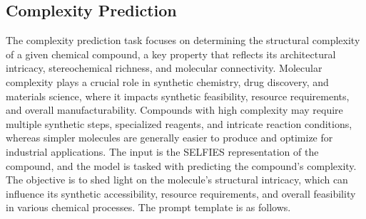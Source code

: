 \subsection{Complexity Prediction}
The complexity prediction task focuses on determining the structural complexity of a given chemical compound, a key property that reflects its architectural intricacy, stereochemical richness, and molecular connectivity. Molecular complexity plays a crucial role in synthetic chemistry, drug discovery, and materials science, where it impacts synthetic feasibility, resource requirements, and overall manufacturability. Compounds with high complexity may require multiple synthetic steps, specialized reagents, and intricate reaction conditions, whereas simpler molecules are generally easier to produce and optimize for industrial applications. The input is the SELFIES representation of the compound, and the model is tasked with predicting the compound’s complexity. The objective is to shed light on the molecule’s structural intricacy, which can influence its synthetic accessibility, resource requirements, and overall feasibility in various chemical processes. The prompt template is as follows.

